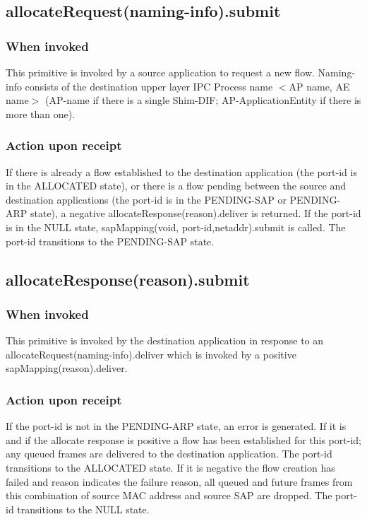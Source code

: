 \subsection{allocateRequest(naming-info).submit}
\subsubsection{When invoked}
This primitive is invoked by a source application to request a new flow. Naming-info consists of the destination upper layer IPC Process name $<$AP name, AE name$>$ (AP-name if there is a single Shim-DIF; AP-ApplicationEntity if there is more than one).
\subsubsection{Action upon receipt}
If there is already a flow established to the destination application (the port-id is in the ALLOCATED state), or there is a flow pending between the source and destination applications (the port-id is in the PENDING-SAP or PENDING-ARP state), a negative allocateResponse(reason).deliver is returned. If the port-id is in the NULL state, sapMapping(void, port-id,netaddr).submit is called. The port-id transitions to the PENDING-SAP state.


\subsection{allocateResponse(reason).submit}
\subsubsection{When invoked}
This primitive is invoked by the destination application in response to an allocateRequest(naming-info).deliver which is invoked by a positive sapMapping(reason).deliver.
\subsubsection{Action upon receipt}
If the port-id is not in the PENDING-ARP state, an error is generated. If it is and if the allocate response is positive a flow has been established for this port-id; any queued frames are delivered to the destination application. The port-id transitions to the ALLOCATED state. If it is negative the flow creation has failed and reason indicates the failure reason, all queued and future frames from this combination of source MAC address and source SAP are dropped. The port-id transitions to the NULL state.


